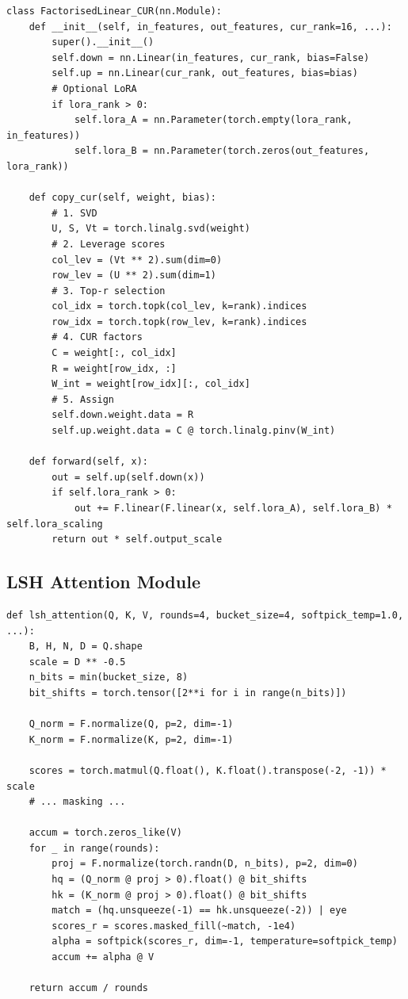 \begin{lstlisting}
class FactorisedLinear_CUR(nn.Module):
    def __init__(self, in_features, out_features, cur_rank=16, ...):
        super().__init__()
        self.down = nn.Linear(in_features, cur_rank, bias=False)
        self.up = nn.Linear(cur_rank, out_features, bias=bias)
        # Optional LoRA
        if lora_rank > 0:
            self.lora_A = nn.Parameter(torch.empty(lora_rank, in_features))
            self.lora_B = nn.Parameter(torch.zeros(out_features, lora_rank))
    
    def copy_cur(self, weight, bias):
        # 1. SVD
        U, S, Vt = torch.linalg.svd(weight)
        # 2. Leverage scores
        col_lev = (Vt ** 2).sum(dim=0)
        row_lev = (U ** 2).sum(dim=1)
        # 3. Top-r selection
        col_idx = torch.topk(col_lev, k=rank).indices
        row_idx = torch.topk(row_lev, k=rank).indices
        # 4. CUR factors
        C = weight[:, col_idx]
        R = weight[row_idx, :]
        W_int = weight[row_idx][:, col_idx]
        # 5. Assign
        self.down.weight.data = R
        self.up.weight.data = C @ torch.linalg.pinv(W_int)
    
    def forward(self, x):
        out = self.up(self.down(x))
        if self.lora_rank > 0:
            out += F.linear(F.linear(x, self.lora_A), self.lora_B) * self.lora_scaling
        return out * self.output_scale
\end{lstlisting}

\subsection{LSH Attention Module}

\begin{lstlisting}
def lsh_attention(Q, K, V, rounds=4, bucket_size=4, softpick_temp=1.0, ...):
    B, H, N, D = Q.shape
    scale = D ** -0.5
    n_bits = min(bucket_size, 8)
    bit_shifts = torch.tensor([2**i for i in range(n_bits)])
    
    Q_norm = F.normalize(Q, p=2, dim=-1)
    K_norm = F.normalize(K, p=2, dim=-1)
    
    scores = torch.matmul(Q.float(), K.float().transpose(-2, -1)) * scale
    # ... masking ...
    
    accum = torch.zeros_like(V)
    for _ in range(rounds):
        proj = F.normalize(torch.randn(D, n_bits), p=2, dim=0)
        hq = (Q_norm @ proj > 0).float() @ bit_shifts
        hk = (K_norm @ proj > 0).float() @ bit_shifts
        match = (hq.unsqueeze(-1) == hk.unsqueeze(-2)) | eye
        scores_r = scores.masked_fill(~match, -1e4)
        alpha = softpick(scores_r, dim=-1, temperature=softpick_temp)
        accum += alpha @ V
    
    return accum / rounds
\end{lstlisting}

